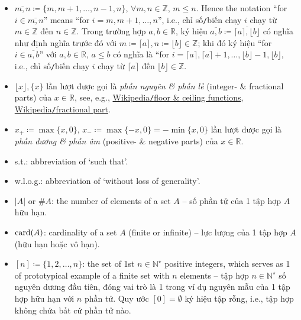 \documentclass{article}
\begin{document}
\begin{itemize}
    \item $\overline{m,n}\coloneqq\{m,m + 1,\ldots,n - 1, n\}$, $\forall m,n\in\mathbb{Z}$, $m\le n$. Hence the notation ``for $i\in\overline{m,n}$'' means ``for $i = m,m + 1,\ldots,n$'', i.e., chỉ số{\tt/}biến chạy $i$ chạy từ $m\in\mathbb{Z}$ đến $n\in\mathbb{Z}$. Trong trường hợp $a,b\in\mathbb{R}$, ký hiệu $\overline{a,b}\coloneqq\overline{\lceil a\rceil,\lfloor b\rfloor}$ có nghĩa như định nghĩa trước đó với $m\coloneqq\lceil a\rceil,n\coloneqq\lfloor b\rfloor\in\mathbb{Z}$; khi đó ký hiệu ``for $i\in\overline{a,b}$'' với $a,b\in\mathbb{R}$, $a\le b$ có nghĩa là ``for $i = \lceil a\rceil,\lceil a\rceil + 1,\ldots,\lfloor b\rfloor - 1,\lfloor b\rfloor$, i.e., chỉ số{\tt/}biến chạy $i$ chạy từ $\lceil a\rceil$ đến $\lfloor b\rfloor\in\mathbb{Z}$.
    \item $\lfloor x\rfloor,\{x\}$ lần lượt được gọi là {\it phần nguyên \& phần lẻ} (integer- \& fractional parts) của $x\in\mathbb{R}$, see, e.g., \href{https://en.wikipedia.org/wiki/Floor_and_ceiling_functions}{Wikipedia{\tt/}floor \& ceiling functions}, \href{https://en.wikipedia.org/wiki/Fractional_part}{Wikipedia{\tt/}fractional part}.
    \item $x_+\coloneqq\max\{x,0\}$, $x_-\coloneqq\max\{-x,0\} = -\min\{x,0\}$ lần lượt được gọi là {\it phần dương \& phần âm} (positive- \& negative parts) của $x\in\mathbb{R}$.
    \item s.t.: abbreviation of `such that'.
    \item w.l.o.g.: abbreviation of `without loss of generality'.
    \item $|A|$ or $\#A$: the number of elements of a set $A$ -- số phần tử của 1 tập hợp $A$ hữu hạn.
    \item ${\rm card}(A)$: cardinality of a set $A$ (finite or infinite) -- lực lượng của 1 tập hợp $A$ (hữu hạn hoặc vô hạn).
    \item $[n]\coloneqq\{1,2,\ldots,n\}$: the set of 1st $n\in\mathbb{N}^\star$ positive integers, which serves as 1 of prototypical example of a finite set with $n$ elements -- tập hợp $n\in\mathbb{N}^\star$ số nguyên dương  đầu tiên, đóng vai trò là 1 trong ví dụ nguyên mẫu của 1 tập hợp hữu hạn với $n$ phần tử. Quy ước $[0] = \emptyset$ ký hiệu tập rỗng, i.e., tập hợp không chứa bất cứ phần tử nào.


\end{itemize}
\end{document}
